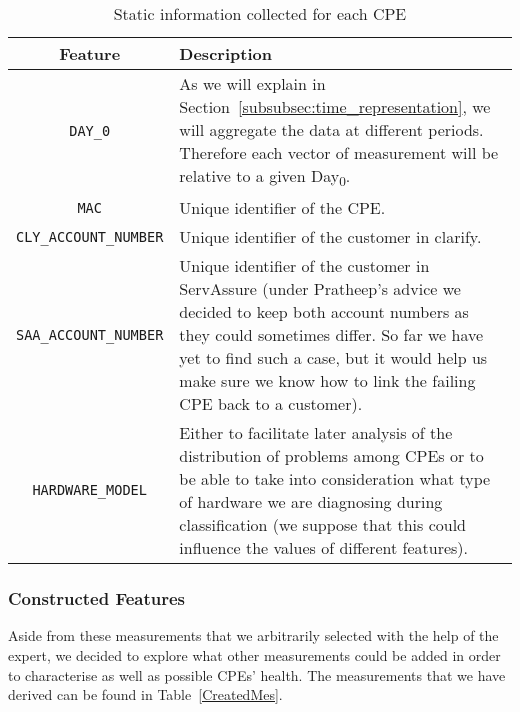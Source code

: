 \begin{table}[h]
\begin{center}
\begin{tabular}{c p{100mm}}
\hline
\textbf{Feature} & \textbf{Description}\\ 
\hline\hline
\texttt{DAY\_0} & As we will explain in Section~\ref{subsubsec:time_representation}, we will aggregate the data at different periods. Therefore each vector of measurement will be relative to a given Day\textsubscript{0}.\\
\hline
\texttt{MAC} & Unique identifier of the CPE.\\
\hline
\texttt{CLY\_ACCOUNT\_NUMBER} & Unique identifier of the customer in clarify.\\
\hline
\texttt{SAA\_ACCOUNT\_NUMBER} & Unique identifier of the customer in ServAssure (under Pratheep's advice we decided to keep both account numbers as they could sometimes differ. So far we have yet to find such a case, but it would help us make sure we know how to link the failing CPE back to a customer).\\
\hline
\texttt{HARDWARE\_MODEL} & Either to facilitate later analysis of the distribution of problems among CPEs  or to be able to take into consideration what type of hardware we are diagnosing during classification (we suppose that this could influence the values of different features).\\
\end{tabular}
\end{center}
\caption{\label{StaticInfos}Static information collected for each CPE}
\end{table}

\subsubsection{Constructed Features}
\label{subsubsec:constructed_features}
Aside from these measurements that we arbitrarily selected with the help of the expert, we decided to explore what other measurements could be added in order to characterise as well as possible CPEs' health. The measurements that we have derived can be found in Table~\ref{CreatedMes}.

